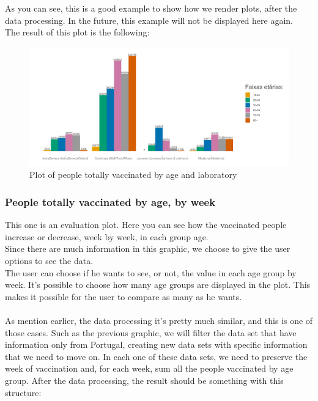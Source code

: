 As you can see, this is a good example to show how we render plots, after the data processing. In the future, this example will not be displayed here again. \\
The result of this plot is the following:\\

\begin{figure}[H]
\centering
\includegraphics[width=400pt,trim=10 0 0 -10mm]{images/coiso3.png}
\caption{Plot of people totally vaccinated by age and laboratory}
\label{fig:ages-vac}
\end{figure}


\subsubsection{People totally vaccinated by age, by week}
This one is an evaluation plot. Here you can see how the vaccinated people increase or decrease, week by week, in each group age.\\
Since there are much information in this graphic, we choose to give the user options to see the data.\\
The user can choose if he wants to see, or not, the value in each age group by week. It's possible to choose how many age groups are displayed in the plot. This makes it possible for the user to compare as many as he wants.\\
\\
As mention earlier, the data processing it's pretty much similar, and this is one of those cases. Such as the previous graphic, we will filter the data set that have information only from Portugal, creating new data sets with specific information that we need to move on. In each one of these data sets, we need to preserve the week of vaccination and, for each week, sum all the people vaccinated by age group.
After the data processing, the result should be something with this structure:\\

